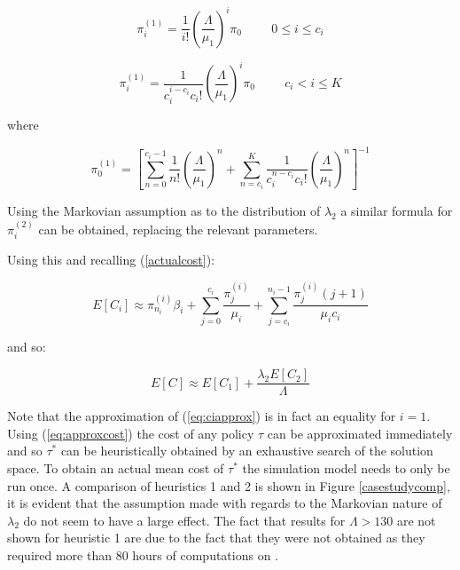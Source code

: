 \documentclass[12pt]{article}
\begin{document}
\begin{equation}\label{eq:probcl}
  \pi^{(1)}_i = \frac{1}{i!}\left(\frac{\Lambda}{\mu_1}\right)^{i}\pi_{0} \hspace{1cm} 0\leq i \leq c_i
\end{equation}

\begin{equation}\label{eq:probc_im}
  \pi^{(1)}_i = \frac{1}{c_i^{i-c_i}c_i!}\left(\frac{\Lambda}{\mu_1}\right)^{i}\pi_{0} \hspace{1cm} c_i< i \leq K
\end{equation}

where

\begin{equation}
\pi^{(1)}_{0} = \left[ \sum_{n=0}^{c_i-1} \frac{1}{n!} \left( \frac{\Lambda}{\mu_1} \right)^{n}  + \sum_{n=c_i}^{K} \frac{1}{c_i^{n-c_i}c_i!} \left( \frac{\Lambda}{\mu_1} \right)^{n} \right] ^{-1}
\end{equation}

Using the Markovian assumption as to the distribution of $\lambda_2$ a similar formula for $\pi_i^{(2)}$ can be obtained, replacing the relevant parameters.

Using this and recalling (\ref{actualcost}):

\begin{equation}\label{eq:ciapprox}
E[C_{i}] \approx \pi_{n_i}^{(i)} \beta_{i} + \sum_{j=0}^{c_{i}} \frac{\pi_{j}^{(i)}}{\mu_{i}} + \sum_{j=c_{i}}^{n_i-1}\frac{ \pi_{j}^{(i)}(j+1)}{ \mu_{i} c_{i}}
\end{equation}

and so:

\begin{equation}\label{eq:approxcost}
E[C]\approx E[C_1] + \frac{\lambda_2E[C_2]}{\Lambda}
\end{equation}

Note that the approximation of (\ref{eq:ciapprox}) is in fact an equality for $i=1$.
Using (\ref{eq:approxcost}) the cost of any policy $\tau$ can be approximated immediately and so $\tau^*$ can be heuristically obtained by an exhaustive search of the solution space.
To obtain an actual mean cost of $\tau^*$ the simulation model needs to only be run once.
A comparison of heuristics 1 and 2 is shown in Figure \ref{casestudycomp}, it is evident that the assumption made with regards to the Markovian nature of $\lambda_2$ do not seem to have a large effect.
The fact that results for $\Lambda >130$ are not shown for heuristic 1 are due to the fact that they were not obtained as they required more than 80 hours of computations on \cite{web002}.
\end{document}
